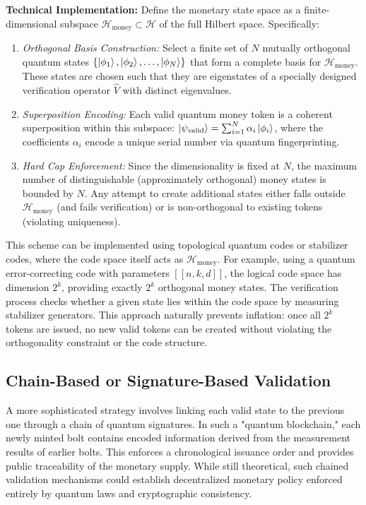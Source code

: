 \documentclass[a4paper,10.5pt,twoside]{article}
\begin{document}
\textbf{Technical Implementation:} Define the monetary state space as a finite-dimensional subspace $\mathcal{H}_{\text{money}} \subset \mathcal{H}$ of the full Hilbert space. Specifically:
\begin{enumerate}
\item \textit{Orthogonal Basis Construction:} Select a finite set of $N$ mutually orthogonal quantum states $\{\ket{\phi_1}, \ket{\phi_2}, \ldots, \ket{\phi_N}\}$ that form a complete basis for $\mathcal{H}_{\text{money}}$. These states are chosen such that they are eigenstates of a specially designed verification operator $\hat{V}$ with distinct eigenvalues.
\item \textit{Superposition Encoding:} Each valid quantum money token is a coherent superposition within this subspace: $\ket{\psi_{\text{valid}}} = \sum_{i=1}^{N} \alpha_i \ket{\phi_i}$, where the coefficients $\alpha_i$ encode a unique serial number via quantum fingerprinting.
\item \textit{Hard Cap Enforcement:} Since the dimensionality is fixed at $N$, the maximum number of distinguishable (approximately orthogonal) money states is bounded by $N$. Any attempt to create additional states either falls outside $\mathcal{H}_{\text{money}}$ (and fails verification) or is non-orthogonal to existing tokens (violating uniqueness).
\end{enumerate}

This scheme can be implemented using topological quantum codes or stabilizer codes, where the code space itself acts as $\mathcal{H}_{\text{money}}$. For example, using a quantum error-correcting code with parameters $[[n,k,d]]$, the logical code space has dimension $2^k$, providing exactly $2^k$ orthogonal money states. The verification process checks whether a given state lies within the code space by measuring stabilizer generators. This approach naturally prevents inflation: once all $2^k$ tokens are issued, no new valid tokens can be created without violating the orthogonality constraint or the code structure.

\subsection{Chain-Based or Signature-Based Validation}\label{s:3.3}
A more sophisticated strategy involves linking each valid state to the previous one through a chain of quantum signatures. In such a "quantum blockchain," each newly minted bolt contains encoded information derived from the measurement results of earlier bolts. This enforces a chronological issuance order and provides public traceability of the monetary supply. While still theoretical, such chained validation mechanisms could establish decentralized monetary policy enforced entirely by quantum laws and cryptographic consistency.
\end{document}
